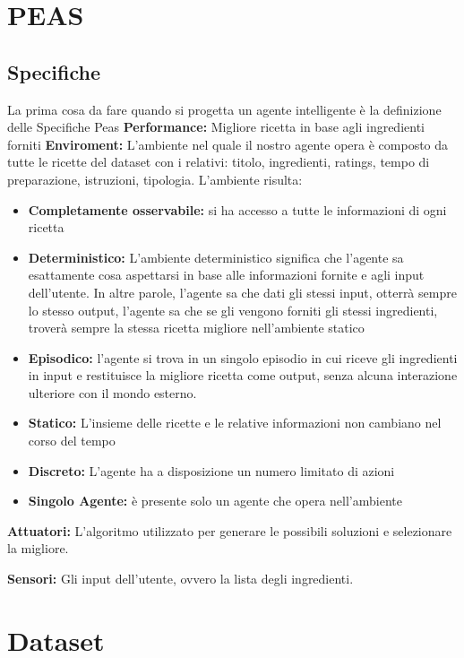 \documentclass[12pt]{report}
\begin{document}
\chapter{PEAS}
\section{Specifiche}
La prima cosa da fare quando si progetta un agente intelligente è la definizione delle Specifiche Peas
\textbf{Performance:} Migliore ricetta in base agli ingredienti forniti
\textbf{Enviroment:} L’ambiente nel quale il nostro agente opera è composto da tutte le ricette del dataset con i relativi: titolo, ingredienti, ratings, tempo di preparazione, istruzioni, tipologia.
L’ambiente risulta:
\begin{itemize}
\item \textbf{Completamente osservabile:} si ha accesso a tutte le informazioni di ogni ricetta
\item \textbf{Deterministico:} L'ambiente deterministico significa che l'agente sa esattamente cosa aspettarsi in base alle informazioni fornite e agli input dell'utente. In altre parole, l'agente sa che dati gli stessi input, otterrà sempre lo stesso output, l'agente sa che se gli vengono forniti gli stessi ingredienti, troverà sempre la stessa ricetta migliore nell'ambiente statico
\item \textbf{Episodico:} l'agente si trova in un singolo episodio in cui riceve gli ingredienti in input e restituisce la migliore ricetta come output, senza alcuna interazione ulteriore con il mondo esterno.
\item \textbf{Statico:} L’insieme delle ricette e le relative informazioni non cambiano nel corso del tempo
\item \textbf{Discreto:} L’agente ha a disposizione un numero limitato di azioni
\item \textbf{Singolo Agente:} è presente solo un agente che opera nell’ambiente
 \end{itemize}


\textbf{Attuatori:} L'algoritmo utilizzato per generare le possibili soluzioni e selezionare la migliore. 

\textbf{Sensori:} Gli input dell'utente, ovvero la lista degli ingredienti.



\chapter{Dataset}
\end{document}
